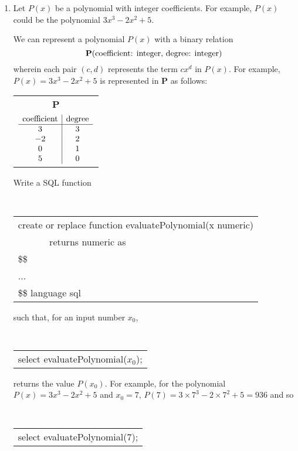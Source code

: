 \documentclass{article}
\begin{document}
\begin{enumerate}

\item Let $P(x)$ be a polynomial with integer coefficients.   For example, $P(x)$ could be the polynomial
$3x^3 -2x^2 + 5$.
  
We can represent a polynomial $P(x)$ with a binary relation
\[\text{{\bf P}(coefficient: integer, degree: integer)}\]
wherein each pair $(c,d)$ represents the term
$cx^d$ in $P(x)$.    For example, $P(x) = 3x^3 -2x^2 + 5$ is represented in {\bf P} as
follows:

\begin{center}
\begin{tabular}{c}
{\bf P} \\ 
 $
\begin{array}{c|c}
\mbox{\rm coefficient} & \mbox{\rm degree} \\ \hline
3 & 3 \\
-2 & 2 \\
0 & 1\\
5 & 0 \\
\end{array}$
\end{tabular}
\end{center}


Write a SQL function

\begin{center}
{\tt 
\begin{tabular}{l}
create or replace function evaluatePolynomial(x numeric)\\
$\qquad\quad$ returns numeric as \\
\$\$ \\
... \\
\$\$ language sql
\end{tabular}
}
\end{center}

\medskip
such that, for an input number $x_0$,

\begin{center}
\medskip
{\tt 
\begin{tabular}{l}
select evaluatePolynomial($x_0$);
\end{tabular}
}
\end{center}

returns the value $P(x_0)$. For example,
for the polynomial $P(x) =  3x^3 -2x^2 + 5$ and $x_0=7$,
$P(7) = 3\times7^3 -2\times7^2 + 5 = 936$ and so

\begin{center}
\medskip
{\tt 
\begin{tabular}{l}
select evaluatePolynomial(7);
\end{tabular}
}
\end{center}


\end{enumerate}
\end{document}
